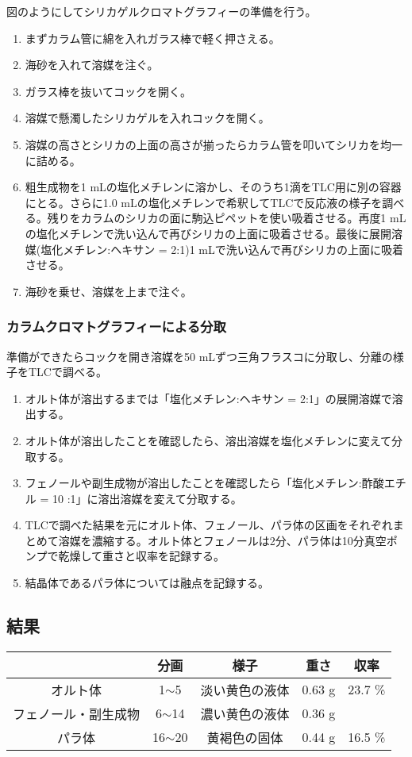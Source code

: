 \documentclass[a4paper,papersize,dvipdfmx]{jsarticle}
\begin{document}
図のようにしてシリカゲルクロマトグラフィーの準備を行う。
\begin{enumerate}
\item まずカラム管に綿を入れガラス棒で軽く押さえる。
\item 海砂を入れて溶媒を注ぐ。
\item ガラス棒を抜いてコックを開く。
\item 溶媒で懸濁したシリカゲルを入れコックを開く。
\item 溶媒の高さとシリカの上面の高さが揃ったらカラム管を叩いてシリカを均一に詰める。
\item 粗生成物を1 mLの塩化メチレンに溶かし、そのうち1滴をTLC用に別の容器にとる。さらに1.0 mLの塩化メチレンで希釈してTLCで反応液の様子を調べる。残りをカラムのシリカの面に駒込ピペットを使い吸着させる。再度1 mLの塩化メチレンで洗い込んで再びシリカの上面に吸着させる。最後に展開溶媒(塩化メチレン:ヘキサン = 2:1)1 mLで洗い込んで再びシリカの上面に吸着させる。
\item 海砂を乗せ、溶媒を上まで注ぐ。

\end{enumerate}
\subsubsection*{カラムクロマトグラフィーによる分取}
準備ができたらコックを開き溶媒を50 mLずつ三角フラスコに分取し、分離の様子をTLCで調べる。

\begin{enumerate}
\item オルト体が溶出するまでは「塩化メチレン:ヘキサン = 2:1」の展開溶媒で溶出する。
\item オルト体が溶出したことを確認したら、溶出溶媒を塩化メチレンに変えて分取する。
\item フェノールや副生成物が溶出したことを確認したら「塩化メチレン:酢酸エチル = 10 :1」に溶出溶媒を変えて分取する。
\item TLCで調べた結果を元にオルト体、フェノール、パラ体の区画をそれぞれまとめて溶媒を濃縮する。オルト体とフェノールは2分、パラ体は10分真空ポンプで乾燥して重さと収率を記録する。
\item 結晶体であるパラ体については融点を記録する。

\end{enumerate}
\subsection*{結果}

\begin{table}[]
\begin{tabular}{|c|c|c|c|c|}
\hline
& 分画         & 様子      & 重さ     & 収率      \\ \hline
オルト体       & 1$\sim$5   & 淡い黄色の液体 & 0.63 g & 23.7 \% \\ \hline
フェノール・副生成物 & 6$\sim$14  & 濃い黄色の液体 & 0.36 g &         \\ \hline
パラ体        & 16$\sim$20 & 黄褐色の固体  & 0.44 g & 16.5 \% 
\\ \hline
\end{tabular}
\end{table}
\end{document}
